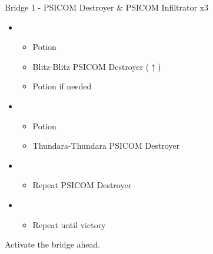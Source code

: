 	\begin{battle}[0:28]{Bridge 1 - PSICOM Destroyer \& PSICOM Infiltrator x3}
		\begin{itemize}
			\item \first
			      \begin{itemize}
				      \item Potion
				      \item Blitz-Blitz PSICOM Destroyer ($\uparrow$)
				      \item Potion if needed
			      \end{itemize}
			\item \second
			      \begin{itemize}
				      \item Potion
				      \item Thundara-Thundara PSICOM Destroyer
			      \end{itemize}
			\item \first
			      \begin{itemize}
				      \item Repeat PSICOM Destroyer
			      \end{itemize}
			\item \fifth
			      \begin{itemize}
				      \item Repeat until victory
			      \end{itemize}
		\end{itemize}
		  
	\end{battle}
	Activate the bridge ahead.
	\vfill

